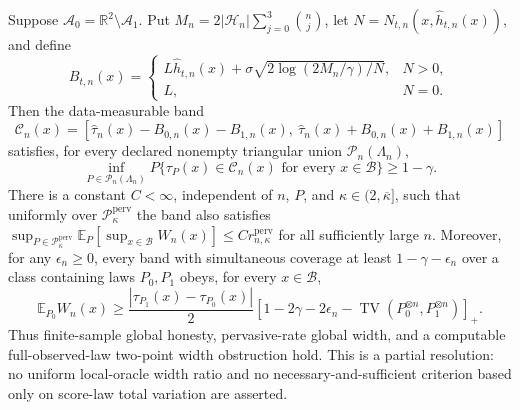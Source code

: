Suppose \(\mathcal A_0=\mathbb R^2\setminus\mathcal A_1\). Put \(M_n=2|\mathcal H_n|\sum_{j=0}^3\binom nj\), let \(N=N_{t,n}(x,\widehat h_{t,n}(x))\), and define
\[
B_{t,n}(x)=
\begin{cases}
L\widehat h_{t,n}(x)+\sigma\sqrt{2\log(2M_n/\gamma)/N},&N>0,\\
L,&N=0.
\end{cases}
\]
Then the data-measurable band
\[
\mathcal C_n(x)=\left[\widehat\tau_n(x)-B_{0,n}(x)-B_{1,n}(x),\ 
\widehat\tau_n(x)+B_{0,n}(x)+B_{1,n}(x)\right]
\]
satisfies, for every declared nonempty triangular union \(\mathcal P_n(\Lambda_n)\),
\[
\inf_{P\in\mathcal P_n(\Lambda_n)}P\{\tau_P(x)\in\mathcal C_n(x)\text{ for every }x\in\mathcal B\}\ge1-\gamma.
\]
There is a constant \(C<\infty\), independent of \(n\), \(P\), and \(\kappa\in(2,\overline\kappa]\), such that uniformly over \(\mathcal P_{\kappa}^{\mathrm{perv}}\) the band also satisfies \(\sup_{P\in\mathcal P_{\kappa}^{\mathrm{perv}}}\mathbb E_P[\sup_{x\in\mathcal B}W_n(x)]\le C r_{n,\kappa}^{\mathrm{perv}}\) for all sufficiently large \(n\). Moreover, for any \(\epsilon_n\ge0\), every band with simultaneous coverage at least \(1-\gamma-\epsilon_n\) over a class containing laws \(P_0,P_1\) obeys, for every \(x\in\mathcal B\),
\[
\mathbb E_{P_0}W_n(x)\ge
\frac{|\tau_{P_1}(x)-\tau_{P_0}(x)|}{2}
\left[1-2\gamma-2\epsilon_n-
\operatorname{TV}(P_0^{\otimes n},P_1^{\otimes n})\right]_+.
\]
Thus finite-sample global honesty, pervasive-rate global width, and a computable full-observed-law two-point width obstruction hold. This is a partial resolution: no uniform local-oracle width ratio and no necessary-and-sufficient criterion based only on score-law total variation are asserted.